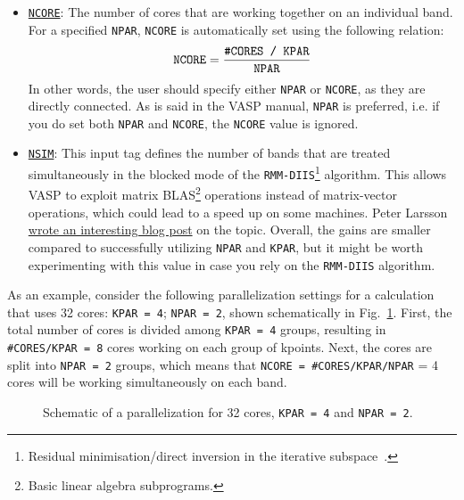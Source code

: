 \begin{refsection}
\begin{itemize}
\item 
\href{https://cms.mpi.univie.ac.at/wiki/index.php/NCORE}{\texttt{NCORE}}: The 
number of cores that are working together on an individual band. For a 
specified \verb|NPAR|, \verb|NCORE| is automatically set using the following 
relation: 
\begin{equation*} 
\texttt{NCORE} = \frac{\texttt{\#CORES / \texttt{KPAR}}}{\texttt{NPAR}} 
\end{equation*} 
In other words, the user should specify either \verb|NPAR| or \verb|NCORE|, as 
they are directly connected. As is said in the \gls{VASP} manual, 
\verb|NPAR| is preferred, i.e. if you do set both \verb|NPAR| and 
\verb|NCORE|, the \verb|NCORE| value is ignored. 
 
 
\item \href{https://cms.mpi.univie.ac.at/wiki/index.php/NSIM}{\texttt{NSIM}}: 
This input tag defines the number of bands that are treated simultaneously in 
the blocked mode of the \texttt{RMM-DIIS}\footnote{Residual minimisation/direct inversion in the iterative subspace~\cite{Wood1985}.} algorithm. This allows \gls{VASP} 
to exploit matrix BLAS\footnote{Basic linear algebra subprograms.} operations instead of matrix-vector operations, which 
could lead to a speed up on some machines. Peter Larsson 
\href{https://www.nsc.liu.se/~pla/blog/2012/02/22/nparnsim/}{wrote an 
interesting blog post} on the topic. Overall, the gains are smaller compared to 
successfully utilizing \verb|NPAR| and \verb|KPAR|, but it might be worth 
experimenting with this value in case you rely on the \texttt{RMM-DIIS} 
algorithm. 
 
\end{itemize} 
 
As an example, consider the following parallelization settings for a 
calculation that uses 32 cores: \texttt{KPAR = 4}; \texttt{NPAR = 2}, shown 
schematically in Fig.~\ref{automation:fig-parallel}. First, the total number 
of cores is divided among \texttt{KPAR = 4} groups, resulting in 
\texttt{\#CORES/KPAR = 8} cores working on each group of kpoints. Next, the 
cores are split into \texttt{NPAR = 2} groups, which means that \texttt{NCORE 
= \#CORES/KPAR/NPAR} = 4 cores will be working simultaneously on each band. 
 
\begin{figure}[hb] 
\centering 
 
\caption{Schematic of a parallelization for 32 cores, \texttt{KPAR = 4}  and 
\texttt{NPAR = 2}.} 
\label{automation:fig-parallel} 
\end{figure} 
 

\end{refsection}
